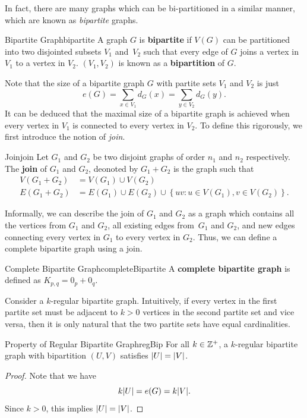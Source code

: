 \documentclass[math]{amznotes}
\theoremstyle{remark}
\newcommand{\0}{\mathbf{0}}
\newcommand{\1}{\mathbf{1}}
\begin{document}
In fact, there are many graphs which can be bi-partitioned in a similar manner, which are known as \textit{bipartite} graphs.
\begin{dfnbox}{Bipartite Graph}{bipartite}
    A graph $G$ is {\color{red} \textbf{bipartite}} if $V(G)$ can be partitioned into two disjointed subsets $V_1$ and~$V_2$ such that every edge of $G$ joins a vertex in $V_1$ to a vertex in $V_2$. $(V_1, V_2)$ is known as a {\color{red} \textbf{bipartition}} of $G$.
\end{dfnbox}
Note that the size of a bipartite graph $G$ with partite sets $V_1$ and $V_2$ is just
\begin{equation*}
    e(G) = \sum_{x \in V_1}d_G(x) = \sum_{y \in V_2}d_G(y).
\end{equation*}
It can be deduced that the maximal size of a bipartite graph is achieved when every vertex in $V_1$ is connected to every vertex in $V_2$. To define this rigorously, we first introduce the notion of \textit{join}.
\begin{dfnbox}{Join}{join}
    Let $G_1$ and $G_2$ be two disjoint graphs of order $n_1$ and $n_2$ respectively. The {\color{red} \textbf{join}} of $G_1$ and $G_2$, deonoted by $G_1 + G_2$ is the graph such that
    \begin{align*}
        V(G_1 + G_2) & = V(G_1) \cup V(G_2) \\
        E(G_1 + G_2) & = E(G_1) \cup E(G_2) \cup \left\{uv \colon u \in V(G_1), v \in V(G_2)\right\}.
    \end{align*}
\end{dfnbox}
Informally, we can describe the join of $G_1$ and $G_2$ as a graph which contains all the vertices from $G_1$ and $G_2$, all existing edges from~$G_1$ and $G_2$, and new edges connecting every vertex in $G_1$ to every vertex in $G_2$. Thus, we can define a complete bipartite graph using a join.
\begin{dfnbox}{Complete Bipartite Graph}{completeBipartite}
    A {\color{red} \textbf{complete bipartite graph}} is defined as $K_{p, q} = 0_p + 0_q$.
\end{dfnbox}
Consider a $k$-regular bipartite graph. Intuitively, if every vertex in the first partite set must be adjacent to $k > 0$ vertices in the second partite set and vice versa, then it is only natural that the two partite sets have equal cardinalities.
\begin{probox}{Property of Regular Bipartite Graph}{regBip}
    For all $k \in \mathbb{Z}^+$, a $k$-regular bipartite graph with bipartition $(U, V)$ satisfies ${\left\lvert {U} \right\rvert} = {\left\lvert {V} \right\rvert}$.
    \tcblower
    \begin{proof}
        Note that we have
        \begin{equation*}
            k{\left\lvert {U} \right\rvert} = e(G) = k{\left\lvert {V} \right\rvert}.
        \end{equation*}
        Since $k > 0$, this implies ${\left\lvert {U} \right\rvert} = {\left\lvert {V} \right\rvert}$.
    \end{proof}
\end{probox}
\end{document}
